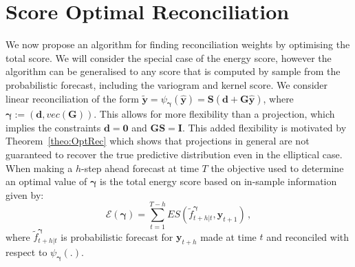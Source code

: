 \documentclass[12pt]{article}
\theoremstyle{definition}
\begin{document}
\section{Score Optimal Reconciliation}\label{sec:scoreoptSGD}

We now propose an algorithm for finding reconciliation weights by optimising the total score.  We will consider the special case of the energy score, however the algorithm can be generalised to any score that is computed by sample from the probabilistic forecast, including the variogram and kernel score.  We consider linear reconciliation of the form $\tilde{\bm{y}}=\psi_{\bm{\gamma}}({\bm{\hat{y}}})={\bm{S}}\left(\bm{d}+\bm{G}{\bm{\hat{y}}}\right)$, where ${\bm\gamma}:=\left(\bm{d},vec(\bm{G})\right)$. This allows for more flexibility than a projection, which implies the constraints $\bm{d}=\bm{0}$ and $\bm{G}\bm{S}=\bm{I}$.  This added flexibility is motivated by Theorem~\ref{theo:OptRec} which shows that projections in general are not guaranteed to recover the true predictive distribution even in the elliptical case. When making a $h$-step ahead forecast at time $T$ the objective used to determine an optimal value of $\bm{\gamma}$ is the total energy score based on in-sample information given by:
\begin{equation}
\mathcal{E}\left(\bm{\gamma}\right)=\sum\limits_{t=1}^{T-h} \textit{ES}(\tilde{f}^{\bm{\gamma}}_{t+h|t},\bm{y}_{t+1})\,,
\label{eq:tes}
\end{equation} 
where $\tilde{f}^{\bm{\bm{\gamma}}}_{t+h|t}$ is probabilistic forecast for $\bm{y}_{t+h}$ made at time $t$ and reconciled with respect to $\psi_{\bm{\gamma}}(.)$.  
\end{document}
